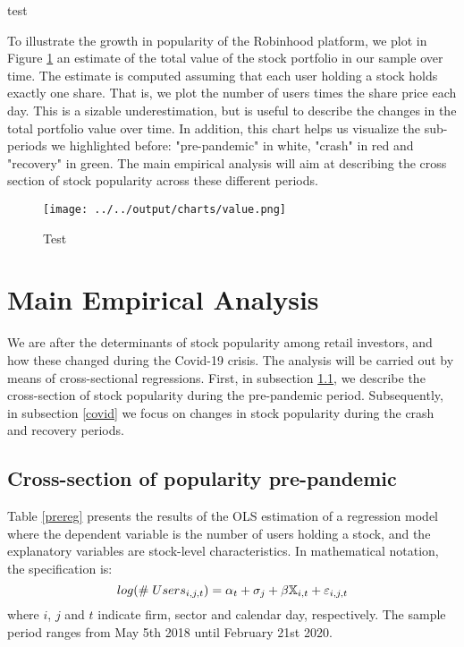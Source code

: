 \documentclass[12pt]{article}
\numberwithin{equation}{section} %
\begin{document}
\begin{table}
\centering
\caption{test} \label{sumstats}
 
\end{table}



To illustrate the growth in popularity of the Robinhood platform, we plot in Figure \ref{linevalue} an estimate of the total value of the stock portfolio in our sample over time. The estimate is computed assuming that each user holding a stock holds exactly one share. That is, we plot the number of users times the share price each day. This is a sizable underestimation, but is useful to describe the changes in the total portfolio value over time. In addition, this chart helps us visualize the sub-periods we highlighted before: "pre-pandemic" in white, "crash" in red and "recovery" in green. The main empirical analysis will aim at describing the cross section of stock popularity across these different periods.

\begin{figure}[h!]
\caption{Test}
\centering \label{linevalue}
\texttt{[image: ../../output/charts/value.png]}
\end{figure}


\section{Main Empirical Analysis} \label{results}

We are after the determinants of stock popularity among retail investors, and how these changed during the Covid-19 crisis. The analysis will be carried out by means of cross-sectional regressions. First, in subsection \ref{pre}, we describe the cross-section of stock popularity during the pre-pandemic period. Subsequently, in subsection \ref{covid} we focus on changes in stock popularity during the crash and recovery periods.

\subsection{Cross-section of popularity pre-pandemic} \label{pre}

Table \ref{prereg} presents the results of the OLS estimation of a regression model where the dependent variable is the number of users holding a stock, and the explanatory variables are stock-level characteristics. In mathematical notation, the specification is:
$$
log(\# \hspace{1mm} Users_{i,j,t}) = \alpha_t + \sigma_j + \beta \mathbb{X}_{i,t} + \varepsilon_{i,j,t}
$$
where $i$, $j$ and $t$ indicate firm, sector and calendar day, respectively. The sample period ranges from May 5th 2018 until February 21st 2020.
\end{document}
